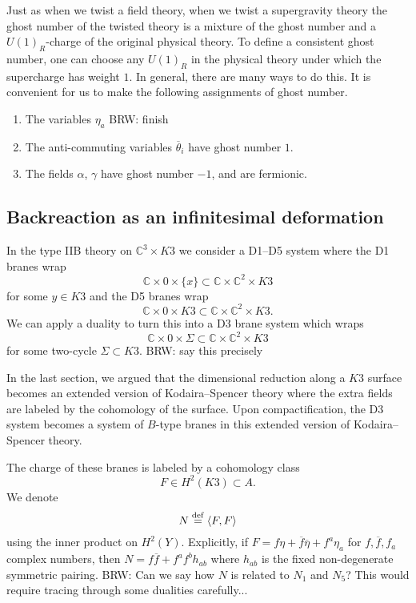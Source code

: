 \documentclass[11pt]{amsart}
\newcommand{\br}{\overline}
\newcommand{\CC}{\mathbb C}
\def\define{\overset{\rm def}{=}}
\newcommand{\ip}[1]{\left\langle #1 \right\rangle}
\def\brian#1{{\textcolor{blue!65!red}{BRW: {#1}}}}
\def\beqn{\begin{equation}}
\def\eeqn{\end{equation}}
\theoremstyle{thm}
\numberwithin{equation}{subsection}
\theoremstyle{def}
\theoremstyle{rem}
\begin{document}
Just as when we twist a field theory, when we twist a supergravity theory the ghost number of the twisted theory  is a mixture of the ghost number and a $U(1)_R$-charge of the original physical theory. To define a consistent ghost number, one can choose any $U(1)_R$ in the physical theory under which the supercharge has weight $1$.  In general, there are many ways to do this.  It is convenient for us to make the following assignments of ghost number.
\begin{enumerate} 
	\item The variables $\eta_a$ \brian{finish}
	\item The anti-commuting variables $\br{\theta}_i$ have ghost number $1$.
	\item The fields $\alpha$, $\gamma$ have ghost number $-1$, and are fermionic.
\end{enumerate}

\subsection{Backreaction as an infinitesimal deformation} 
\label{sec:conifold}

In the type IIB theory on $\CC^3 \times K3$ we consider a D1--D5 system where the D1 branes wrap 
\[
\CC \times 0 \times \{x\} \subset \CC \times \CC^2 \times K3 
\]
for some $y \in K3$ and the D5 branes wrap 
\[
\CC \times 0 \times K3 \subset \CC \times \CC^2 \times K3 .
\]
We can apply a duality to turn this into a D3 brane system which wraps 
\[
\CC \times 0 \times \Sigma \subset \CC \times \CC^2 \times K3 
\]
for some two-cycle $\Sigma \subset K3$. 
\brian{say this precisely}

In the last section, we argued that the dimensional reduction along a $K3$ surface becomes an extended version of Kodaira--Spencer theory where the extra fields are labeled by the cohomology of the surface.
Upon compactification, the D3 system becomes a system of $B$-type branes in this extended version of Kodaira--Spencer theory. 

The charge of these branes is labeled by a cohomology class 
\beqn
F \in H^2(K3) \subset A .
\eeqn
We denote 
\beqn
N \define \ip{F, F}
\eeqn
using the inner product on $H^2(Y)$. 
Explicitly, if $F = f \eta + \br f \br \eta + f^a \eta_a$ for $f, \br f, f_a$ complex numbers, then $N = f \br f + f^{a} f^{b} h_{ab}$ where $h_{ab}$ is the fixed non-degenerate symmetric pairing. 
\brian{Can we say how $N$ is related to $N_1$ and $N_5$? This would require tracing through some dualities carefully...}
\end{document}
